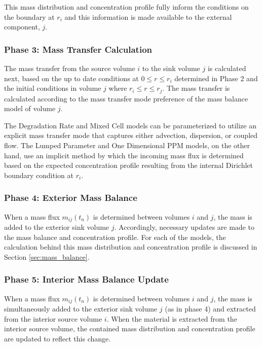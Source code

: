 This mass distribution and concentration profile fully inform 
the conditions on the boundary at $r_i$ and this information is made available 
to the external component, $j$.


\subsubsection{Phase 3: Mass Transfer Calculation}

The mass transfer from the source volume $i$ to the sink volume $j$ is 
calculated next, based on the up to date conditions at $0\le r \le r_{i}$ 
determined in Phase 2 and the initial conditions in volume $j$ where $r_i \le r 
\le r_j$. The mass transfer is calculated according to the mass transfer mode 
preference of the mass balance model of volume $j$.  

The Degradation Rate and Mixed Cell models can be parameterized to utilize an 
explicit mass transfer mode that captures either advection, dispersion, or 
coupled flow.  The Lumped Parameter and One Dimensional PPM models, on the 
other hand, use an implicit method by which the incoming mass flux is determined 
based on the expected concentration profile resulting from the internal 
Dirichlet boundary condition at $r_i$. 

\subsubsection{Phase 4: Exterior Mass Balance}

When a mass flux $m_{ij}(t_n)$ is determined between volumes $i$ and $j$, the 
mass is added to the exterior sink volume $j$. Accordingly, necessary updates 
are made to the mass balance and concentration profile.  For each of the 
models, the calculation behind this mass distribution and concentration profile 
is discussed in Section \ref{sec:mass_balance}.

\subsubsection{Phase 5: Interior Mass Balance Update}

When a mass flux $m_{ij}(t_n)$ is determined between volumes $i$ and $j$, the 
mass is simultaneously added to the exterior sink volume $j$ (as in phase 4) and 
extracted from the interior source volume $i$.  When the material is extracted 
from the interior source volume, the contained mass distribution and 
concentration profile are updated to reflect this change.  

